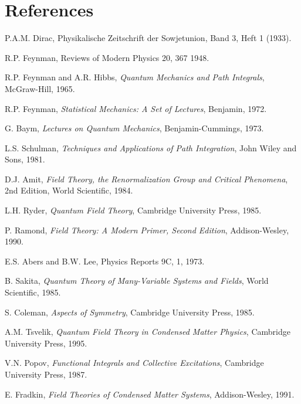 \documentclass[12pt]{article}
\begin{document}
\newpage\thispagestyle{empty}
\section{References}

\ben
\item P.A.M. Dirac, Physikalische Zeitschrift der Sowjetunion, Band 3,
  Heft 1 (1933).
\item R.P. Feynman, Reviews of Modern Physics 20, 367 1948.
\item R.P. Feynman and A.R. Hibbs, {\sl Quantum Mechanics and Path
    Integrals}, McGraw-Hill, 1965.
\item R.P. Feynman, {\sl Statistical Mechanics: A Set of Lectures},
  Benjamin, 1972.
\item G. Baym, {\sl Lectures on Quantum Mechanics}, Benjamin-Cummings,
  1973.
\item L.S. Schulman, {\sl Techniques and Applications of Path
    Integration}, John Wiley and Sons, 1981.
\item D.J. Amit, {\sl Field Theory, the Renormalization Group and
  Critical Phenomena}, 2nd Edition, World Scientific, 1984.
\item L.H. Ryder, {\sl Quantum Field Theory}, Cambridge University
  Press, 1985.
\item P. Ramond, {\sl Field Theory: A Modern Primer, Second Edition},
  Addison-Wesley, 1990. 
\item E.S. Abers and B.W. Lee, Physics Reports 9C, 1, 1973.
\item B. Sakita, {\sl Quantum Theory of Many-Variable Systems and
  Fields}, World Scientific, 1985.
\item S. Coleman, {\sl Aspects of Symmetry}, Cambridge University
  Press, 1985.
\item A.M. Tsvelik, {\sl Quantum Field Theory in Condensed Matter
    Physics}, Cambridge University Press, 1995.
\item V.N. Popov, {\sl Functional Integrals and Collective
    Excitations}, Cambridge University Press, 1987.
\item E. Fradkin, {\sl Field Theories of Condensed Matter Systems},
  Addison-Wesley, 1991.
\een
\end{document}
